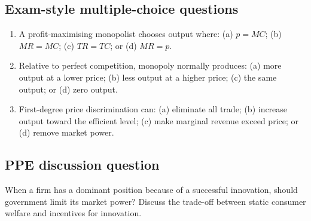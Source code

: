 \subsection*{Exam-style multiple-choice questions}
\begin{enumerate}[resume,label=\arabic*.]
  \item A profit-maximising monopolist chooses output where: (a) $p=MC$; (b) $MR=MC$; (c) $TR=TC$; or (d) $MR=p$.
  \item Relative to perfect competition, monopoly normally produces: (a) more output at a lower price; (b) less output at a higher price; (c) the same output; or (d) zero output.
  \item First-degree price discrimination can: (a) eliminate all trade; (b) increase output toward the efficient level; (c) make marginal revenue exceed price; or (d) remove market power.
\end{enumerate}

\subsection*{PPE discussion question}

\noindent When a firm has a dominant position because of a successful
innovation, should government limit its market power? Discuss the trade-off
between static consumer welfare and incentives for innovation.
